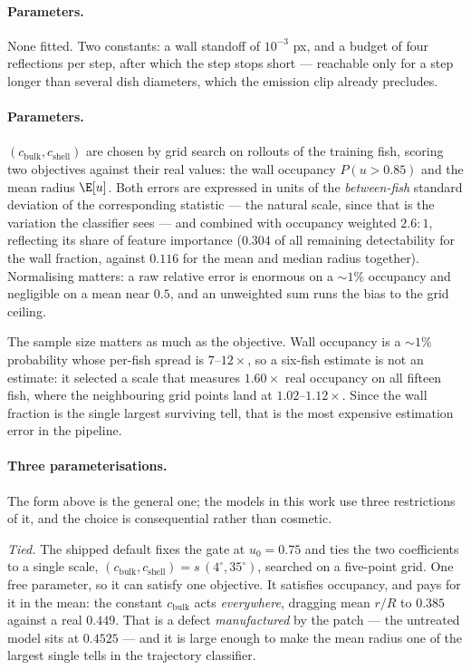\paragraph{Parameters.} None fitted. Two constants: a wall standoff of $10^{-3}$ px, and a budget
of four reflections per step, after which the step stops short --- reachable only for a step longer
than several dish diameters, which the emission clip already precludes.



\paragraph{Parameters.} $(c_{\text{bulk}},c_{\text{shell}})$ are chosen by grid search on rollouts
of the training fish, scoring two objectives against their real values: the wall occupancy
$P(u>0.85)$ and the mean radius $\E[u]$. Both errors are expressed in units of the
\emph{between-fish} standard deviation of the corresponding statistic --- the natural scale, since
that is the variation the classifier sees --- and combined with occupancy weighted $2.6{:}1$,
reflecting its share of feature importance ($0.304$ of all remaining detectability for the wall
fraction, against $0.116$ for the mean and median radius together). Normalising matters: a raw
relative error is enormous on a ${\sim}1\%$ occupancy and negligible on a mean near $0.5$, and an
unweighted sum runs the bias to the grid ceiling.

The sample size matters as much as the objective. Wall occupancy is a ${\sim}1\%$ probability whose
per-fish spread is $7$--$12\times$, so a six-fish estimate is not an estimate: it selected a scale
that measures $1.60\times$ real occupancy on all fifteen fish, where the neighbouring grid points
land at $1.02$--$1.12\times$. Since the wall fraction is the single largest surviving tell, that is
the most expensive estimation error in the pipeline.

\paragraph{Three parameterisations.} The form above is the general one; the models in this work use
three restrictions of it, and the choice is consequential rather than cosmetic.

\emph{Tied.} The shipped default fixes the gate at $u_0=0.75$ and ties the two coefficients to a
single scale, $(c_{\text{bulk}},c_{\text{shell}})=s\,(4^\circ,35^\circ)$, searched on a five-point
grid. One free parameter, so it can satisfy one objective. It satisfies occupancy, and pays for it
in the mean: the constant $c_{\text{bulk}}$ acts \emph{everywhere}, dragging mean $r/R$ to $0.385$
against a real $0.449$. That is a defect \emph{manufactured} by the patch --- the untreated model
sits at $0.4525$ --- and it is large enough to make the mean radius one of the largest single tells
in the trajectory classifier.

